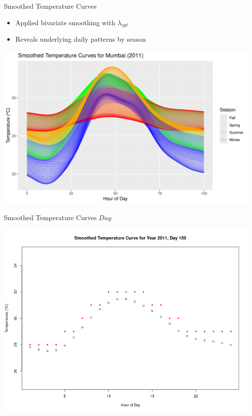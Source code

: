 \documentclass[svgnames, 12pt]{beamer}
\begin{document}
\begin{frame}{Smoothed Temperature Curves}
	\begin{itemize}
		\item Applied bivariate smoothing with $\lambda_{opt}$
		\item Reveals underlying daily patterns by season
	\end{itemize}
	\begin{center}
		\includegraphics[width=0.8\linewidth]{../notebooks/assets/smoothed_temp_curves_mumbai.png}
	\end{center}
\end{frame}

\begin{frame}{Smoothed Temperature Curves \(Day\)}
	\begin{center}
		\includegraphics[width=0.8\linewidth]{../notebooks/assets/smoothed_temp_curve_day.png}
	\end{center}
\end{frame}
\end{document}
